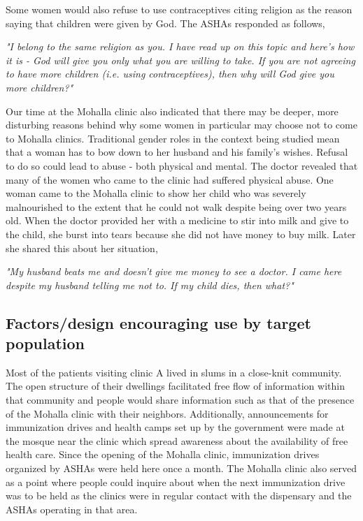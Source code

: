 Some women would also refuse to use contraceptives citing religion as the reason saying that children were given by God. The ASHAs responded as follows,

\textit{"I belong to the same religion as you. I have read up on this topic and here's how it is - God will give you only what you are willing to take. If you are not agreeing to have more children (i.e. using contraceptives), then why will God give you more children?"}

Our time at the Mohalla clinic also indicated that there may be deeper, more disturbing reasons behind why some women in particular may choose not to come to Mohalla clinics. Traditional gender roles in the context being studied mean that a woman has to bow down to her husband and his family's wishes. Refusal to do so could lead to abuse - both physical and mental. The doctor revealed that many of the women who came to the clinic had suffered physical abuse. One woman came to the Mohalla clinic to show her child who was severely malnourished to the extent that he could not walk despite being over two years old. When the doctor provided her with a medicine to stir into milk and give to the child, she burst into tears because she did not have money to buy milk. Later she shared this about her situation,

\textit{"My husband beats me and doesn’t give me money to see a doctor. I came here despite my husband telling me not to. If my child dies, then what?"}

\subsection{Factors/design encouraging use by target population}
Most of the patients visiting clinic A lived in slums in a close-knit community. The open structure of their dwellings facilitated free flow of information within that community and people would share information such as that of the presence of the Mohalla clinic with their neighbors. Additionally, announcements for immunization drives and health camps set up by the government were made at the mosque near the clinic which spread awareness about the availability of free health care. Since the opening of the Mohalla clinic, immunization drives organized by ASHAs were held here once a month. The Mohalla clinic also served as a point where people could inquire about when the next immunization drive was to be held as the clinics were in regular contact with the dispensary and the ASHAs operating in that area.

